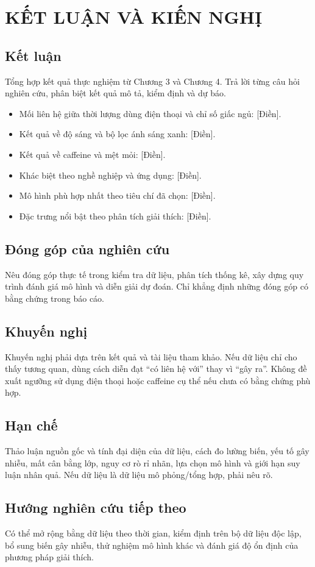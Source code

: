 \chapter{KẾT LUẬN VÀ KIẾN NGHỊ}
\section{Kết luận}
Tổng hợp kết quả thực nghiệm từ Chương 3 và Chương 4. Trả lời từng câu hỏi nghiên cứu, phân biệt kết quả mô tả, kiểm định và dự báo.
\begin{itemize}[leftmargin=1.2cm]
\item Mối liên hệ giữa thời lượng dùng điện thoại và chỉ số giấc ngủ: [Điền].
\item Kết quả về độ sáng và bộ lọc ánh sáng xanh: [Điền].
\item Kết quả về caffeine và mệt mỏi: [Điền].
\item Khác biệt theo nghề nghiệp và ứng dụng: [Điền].
\item Mô hình phù hợp nhất theo tiêu chí đã chọn: [Điền].
\item Đặc trưng nổi bật theo phân tích giải thích: [Điền].
\end{itemize}
\section{Đóng góp của nghiên cứu}
Nêu đóng góp thực tế trong kiểm tra dữ liệu, phân tích thống kê, xây dựng quy trình đánh giá mô hình và diễn giải dự đoán. Chỉ khẳng định những đóng góp có bằng chứng trong báo cáo.
\section{Khuyến nghị}
Khuyến nghị phải dựa trên kết quả và tài liệu tham khảo. Nếu dữ liệu chỉ cho thấy tương quan, dùng cách diễn đạt “có liên hệ với” thay vì “gây ra”. Không đề xuất ngưỡng sử dụng điện thoại hoặc caffeine cụ thể nếu chưa có bằng chứng phù hợp.
\section{Hạn chế}
Thảo luận nguồn gốc và tính đại diện của dữ liệu, cách đo lường biến, yếu tố gây nhiễu, mất cân bằng lớp, nguy cơ rò rỉ nhãn, lựa chọn mô hình và giới hạn suy luận nhân quả. Nếu dữ liệu là dữ liệu mô phỏng/tổng hợp, phải nêu rõ.
\section{Hướng nghiên cứu tiếp theo}
Có thể mở rộng bằng dữ liệu theo thời gian, kiểm định trên bộ dữ liệu độc lập, bổ sung biến gây nhiễu, thử nghiệm mô hình khác và đánh giá độ ổn định của phương pháp giải thích.
